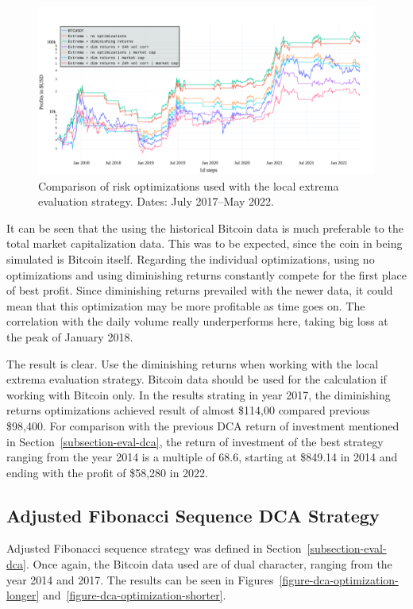 \begin{figure}[!t]
    \centering
    \includegraphics[width=\columnwidth]{figures/evaluation-optimization-shorter.pdf}
    \caption{Comparison of risk optimizations used with the local extrema evaluation strategy. Dates: July 2017--May 2022.}
    \label{figure-optimization-shorter}
\end{figure}

It can be seen that the using the historical Bitcoin data is much preferable to the total market capitalization data. This was to be expected, since the coin in being simulated is Bitcoin itself. Regarding the individual optimizations, using no optimizations and using diminishing returns constantly compete for the first place of best profit. Since diminishing returns prevailed with the newer data, it could mean that this optimization may be more profitable as time goes on. The correlation with the daily volume really underperforms here, taking big loss at the peak of January 2018.

The result is clear. Use the diminishing returns when working with the local extrema evaluation strategy. Bitcoin data should be used for the calculation if working with Bitcoin only. In the results strating in year 2017, the diminishing returns optimizations achieved result of almost \$114,00 compared previous \$98,400. For comparison with the previous DCA return of investment mentioned in Section~\ref{subsection-eval-dca}, the return of investment of the best strategy ranging from the year 2014 is a multiple of 68.6, starting at \$849.14 in 2014 and ending with the profit of \$58,280 in 2022.

\subsection*{Adjusted Fibonacci Sequence DCA Strategy}
Adjusted Fibonacci sequence strategy was defined in Section~\ref{subsection-eval-dca}. Once again, the Bitcoin data used are of dual character, ranging from the year 2014 and 2017. The results can be seen in Figures~\ref{figure-dca-optimization-longer} and~\ref{figure-dca-optimization-shorter}.


